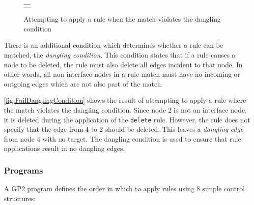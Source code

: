\documentclass[authoryearcitations]{UoYCSproject}
\newenvironment{nscenter}
    {\parskip=0pt\par\nopagebreak\centering}
    {\par\noindent\ignorespacesafterend}
\begin{document}
\begin{figure}
\begin{framed}
\begin{nscenter}
\begin{tabular}{l}
\begin{tikzpicture}
            \end{tikzpicture}

        \end{tabular}
    \end{nscenter}
    \end{framed}
    \caption{Attempting to apply a rule when the match violates the dangling condition}
    \label{fig:FailDanglingCondition}
\end{figure}

There is an additional condition which determines whether a rule can be matched, the
\emph{dangling condition}. This condition states that if a rule causes a node to be
deleted, the rule must also delete all edges incident to that node. In
other words, all non-interface nodes in a rule match must have no incoming or outgoing
edges which are not also part of the match.

\autoref{fig:FailDanglingCondition} shows the result of attempting to apply a rule
where the match violates the dangling condition. Since node 2 is not an interface
node, it is deleted during the application of the \texttt{delete} rule. However, the
rule does not specify that the edge from 4 to 2 should be deleted. This leaves a
\emph{dangling edge} from node 4 with no target. The dangling condition is used to
ensure that rule applications result in no dangling edges.


\subsubsection{Programs}
\label{sec:Programs}

A GP2 program defines the order in which to apply rules using 8 simple control
structures:
\end{document}
